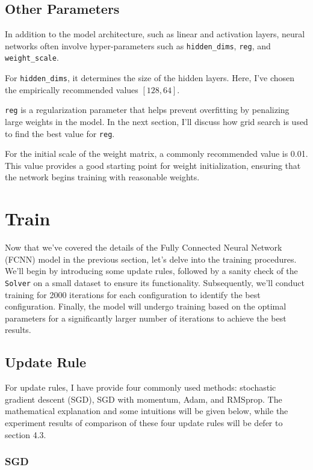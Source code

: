 \documentclass[10pt,a4paper,twoside]{tau}
\begin{document}
\subsection{Other Parameters}

In addition to the model architecture, such as linear and activation layers, neural networks often involve hyper-parameters such as \texttt{hidden\_dims}, \texttt{reg}, and \texttt{weight\_scale}. 

For \texttt{hidden\_dims}, it determines the size of the hidden layers. Here, I've chosen the empirically recommended values $[128, 64]$.

\texttt{reg} is a regularization parameter that helps prevent overfitting by penalizing large weights in the model. In the next section, I'll discuss how grid search is used to find the best value for \texttt{reg}.

For the initial scale of the weight matrix, a commonly recommended value is 0.01. This value provides a good starting point for weight initialization, ensuring that the network begins training with reasonable weights.

\section{Train}

Now that we've covered the details of the Fully Connected Neural Network (FCNN) model in the previous section, let's delve into the training procedures. We'll begin by introducing some update rules, followed by a sanity check of the \texttt{Solver} on a small dataset to ensure its functionality. Subsequently, we'll conduct training for 2000 iterations for each configuration to identify the best configuration. Finally, the model will undergo training based on the optimal parameters for a significantly larger number of iterations to achieve the best results.


\subsection{Update Rule}

For update rules, I have provide four commonly used methods: stochastic gradient descent (SGD), SGD with momentum, Adam, and RMSprop. The mathematical explanation and some intuitions will be given below, while the experiment results of comparison of these four update rules will be defer to section 4.3.

\subsubsection{SGD}
\end{document}
